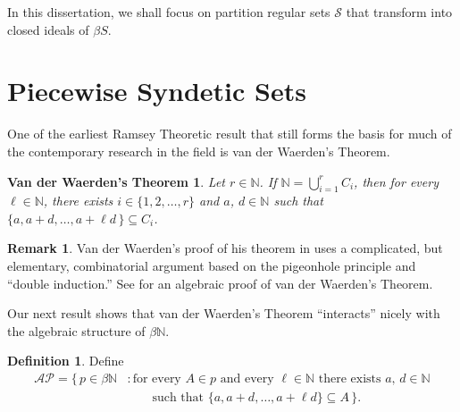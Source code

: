 \documentclass[12pt]{article}
\theoremstyle{plain}
\newtheorem{vdw}[thm]{Van der Waerden's Theorem}
\theoremstyle{definition}
\newtheorem{defn}[thm]{Definition}
\newtheorem{rmk}[thm]{Remark}
\newcommand{\bbN}{\mathbb{N}}
\newcommand{\AP}{\mathcal{AP}}
\newcommand{\calS}{\mathcal{S}}
\begin{document}
In this dissertation, we shall focus on partition regular sets $\calS$ that transform into closed ideals of $\beta S$. 

\section{Piecewise Syndetic Sets}
One of the earliest Ramsey Theoretic result that still forms the basis for much of the contemporary research in the field is van der Waerden's Theorem.

\begin{vdw}
  Let $r \in \bbN$. 
  If $\bbN = \bigcup_{i=1}^r C_i$, then for every $\ell \in \bbN$, there exists $i \in \{1, 2, \ldots, r\}$ and $a$, $d \in \bbN$ such that $\{a, a+d, \ldots, a+\ell d \,\} \subseteq C_i$.
\end{vdw}
\begin{rmk}
  Van der Waerden's proof of his theorem in \cite{Van-der-Waerden:1927fk} uses a complicated, but elementary, combinatorial argument based on the pigeonhole principle and ``double induction.''%
  See \cite[Theorem 14.1 and Corollary 14.2]{Hindman:1998fk} for an algebraic proof of van der Waerden's Theorem.
\end{rmk}

Our next result shows that van der Waerden's Theorem ``interacts'' nicely with the algebraic structure of $\beta\bbN$.
\begin{defn}
  Define 
  \begin{align*}
    \AP = \{\, p \in \beta\bbN &: \mbox{for every $A \in p$ and every $\ell \in \bbN$ there exists $a$, $d\in \bbN$} \\
    &\hspace{2em}\mbox{such that $\{a, a+d, \ldots, a+\ell d\} \subseteq A$} \,\}.
  \end{align*}
\end{defn}
\end{document}
